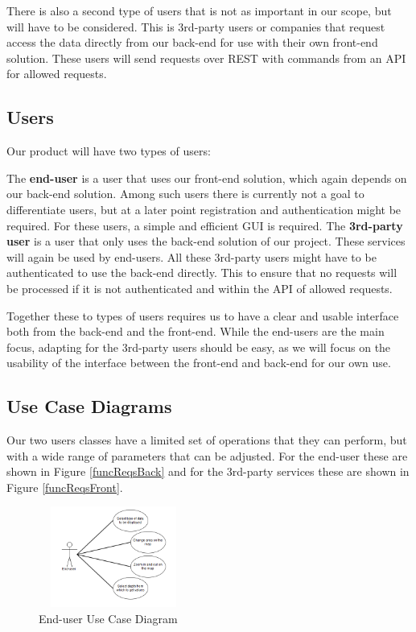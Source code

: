 \documentclass[11pt,a4paper,titlepage,oneside]{report}
\begin{document}
  There is also a second type of users that is not as important in our scope, but will have to be considered. This is 3rd-party users or companies that request access the data directly from our back-end for use with their own front-end solution. These users will send requests over REST with commands from an API for allowed requests.

  \subsection{Users}
  Our product will have two types of users:
  
  The \textbf{end-user} is a user that uses our front-end solution, which again depends on our back-end solution. Among such users there is currently not a goal to differentiate users, but at a later point registration and authentication might be required. For these users, a simple and efficient GUI is required.  
  The \textbf{3rd-party user} is a user that only uses the back-end solution of our project. These services will again be used by end-users. All these 3rd-party users might have to be authenticated to use the back-end directly. This to ensure that no requests will be processed if it is not authenticated and within the API of allowed requests.
  
  Together these to types of users requires us to have a clear and usable interface both from the back-end and the front-end. While the end-users are the main focus, adapting for the 3rd-party users should be easy, as we will focus on the usability of the interface between the front-end and back-end for our own use.

  \subsection{Use Case Diagrams}
  Our two users classes have a limited set of operations that they can perform, but with a wide range of parameters that can be adjusted. For the end-user these are shown in Figure \ref{funcReqsBack} and for the 3rd-party services these are shown in Figure \ref{funcReqsFront}.
  \begin{figure}[h]
	\begin{center}
	\includegraphics[height=125px,width=186px]{img/useCase_EndUser.png}
	\caption{End-user Use Case Diagram}
	\label{fig:endUserUseDiagram}
	\small
	\end{center}
  \end{figure}
\end{document}
